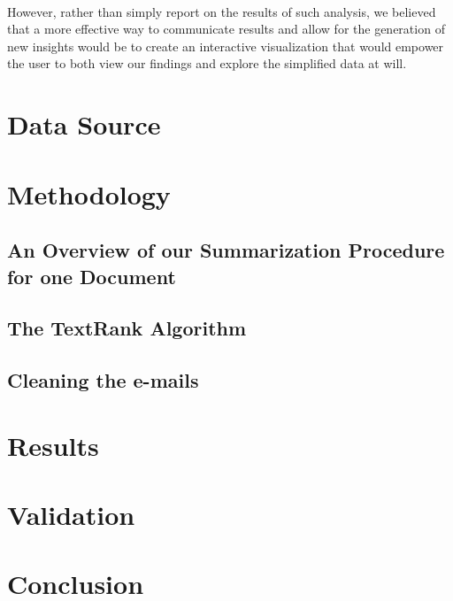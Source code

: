\documentclass[11pt]{article}
\begin{document}
\paragraph{} However, rather than simply report on the results of such analysis, we believed that a more effective way to communicate results and allow for the generation of new insights would be to create an interactive visualization that would empower the user to both view our findings and explore the simplified data at will.

\section{Data Source}

\section{Methodology}

\subsection{An Overview of our Summarization Procedure for one Document}
%

\subsection{The TextRank Algorithm}
%

\subsection{Cleaning the e-mails}
%

\section{Results}

\section{Validation}

\section{Conclusion}



\end{document}
